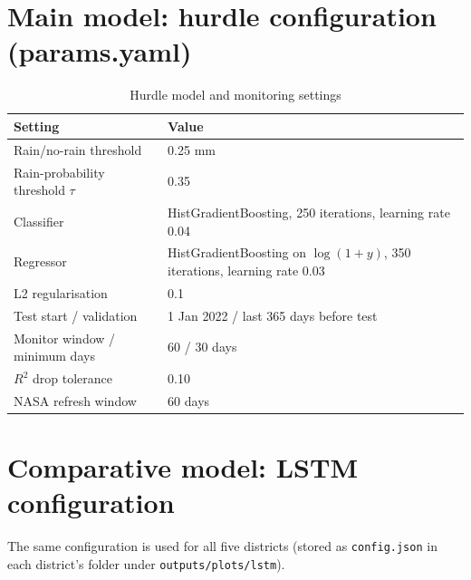 \label{app:config}
\section{Main model: hurdle configuration (params.yaml)}
\begin{table}[H]
	\centering
	\caption{Hurdle model and monitoring settings}
	\small
	\begin{tabularx}{\textwidth}{lY}
		\toprule
		\textbf{Setting} & \textbf{Value} \\
		\midrule
		Rain/no-rain threshold & 0.25 mm \\
		Rain-probability threshold $\tau$ & 0.35 \\
		Classifier & HistGradientBoosting, 250 iterations, learning rate 0.04 \\
		Regressor & HistGradientBoosting on $\log(1+y)$, 350 iterations, learning rate 0.03 \\
		L2 regularisation & 0.1 \\
		Test start / validation & 1 Jan 2022 / last 365 days before test \\
		Monitor window / minimum days & 60 / 30 days \\
		$R^2$ drop tolerance & 0.10 \\
		NASA refresh window & 60 days \\
		\bottomrule
	\end{tabularx}
\end{table}

\section{Comparative model: LSTM configuration}
The same configuration is used for all five districts (stored as \texttt{config.json} in each district's folder under \texttt{outputs/plots/lstm}).


